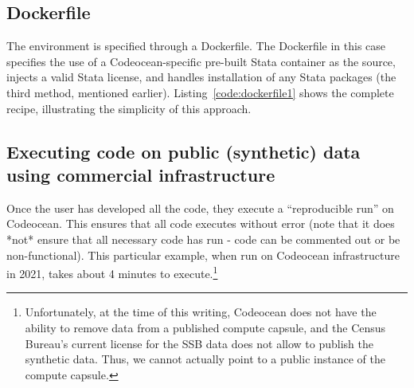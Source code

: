 \documentclass[inline]{hdsr}
\begin{document}








\subsection{Dockerfile}

The environment is specified through a Dockerfile. The Dockerfile in this case specifies the use of a Codeocean-specific pre-built Stata container as the source, injects a valid Stata license, and handles installation of any Stata packages (the third method, mentioned earlier). Listing~\ref{code:dockerfile1} shows the complete recipe, illustrating the simplicity of this approach. 



\subsection{Executing code on public (synthetic) data using commercial infrastructure}

Once the user has developed all the code, they execute a ``reproducible run'' on Codeocean. This ensures that all code executes without error (note that it does *not* ensure that all necessary code has run - code can be commented out or be non-functional). This particular example, when run on Codeocean infrastructure in 2021, takes about 4 minutes to execute.\footnote{Unfortunately, at the time of this writing, Codeocean does not have the ability to remove data from a published compute capsule, and the Census Bureau's current license for the SSB data does not allow to publish the synthetic data. Thus, we cannot actually point to a public instance of the compute capsule.}
\end{document}
